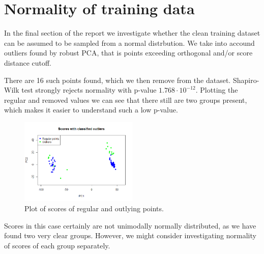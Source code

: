 \documentclass[12pt]{article}
\begin{document}
\section{Normality of training data}
In the final section of the report we investigate whether the clean training dataset can be assumed to be sampled from a normal distrbution.
We take into accound outliers found by robust PCA, that is points exceeding orthogonal and/or score distance cutoff. 

There are 16 such points found, which we then remove from the dataset. Shapiro-Wilk test strongly rejects normality with p-value 
$1.768\cdot 10^{-12}.$ Plotting the regular and removed values we can see that there still are two groups present, which makes it
easier to understand such a low p-value.
\begin{figure}[ht!]
  \begin{center}
    \centering
      \includegraphics[width=0.5\textwidth]{../images/regularAndOutliers.png}
      \caption{Plot of scores of regular and outlying points.}
      \label{fig:regularAndOutliers}
  \end{center}
\end{figure}

Scores in this case certainly are not unimodally normally distributed, as we have found two very clear groups. However, we might consider investigating normality of scores of
each group separately.
\end{document}
